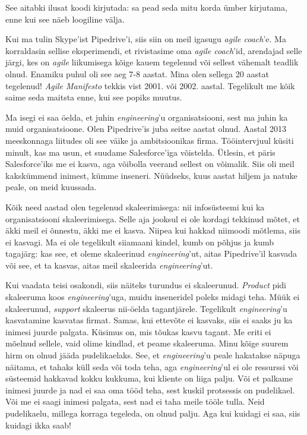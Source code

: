 See aitabki ilusat koodi kirjutada: sa 
pead seda mitu korda ümber kirjutama, enne kui see näeb loogiline välja.


Kui ma tulin Skype'ist Pipedrive'i, siis siin on meil 
igasugu \emph{agile coach}'e. Ma korraldasin sellise eksperimendi, et rivistasime oma 
\emph{agile coach}'id, arendajad selle järgi, kes on 
\emph{agile} liikumisega kõige kauem tegelenud või sellest vähemalt teadlik olnud. Enamiku puhul oli see aeg 7-8 aastat. Mina olen sellega 20 
aastat tegelenud! \emph{Agile Manifesto} tekkis vist 2001. või 
2002. aastal. Tegelikult me kõik saime seda maitsta enne, kui see popiks muutus.


Ma isegi ei saa öelda, et juhin \emph{engineering}'u 
organisatsiooni, sest ma juhin ka muid organisatsioone. Olen 
Pipedrive'is juba seitse aastat olnud. Aastal 
2013 meeskonnaga liitudes oli see väike ja ambitsioonikas firma. Tööintervjuul küsiti minult, kas ma usun, et suudame Salesforce'iga võistelda. Ütlesin, et päris 
Salesforce'iks me ei kasva, aga võibolla veerand sellest on võimalik. Siis 
oli meil kakskümmend inimest, kümme inseneri. Nüüdseks, kuus aastat hiljem ja natuke peale, on meid kuussada.

Kõik need aastad olen tegelenud skaleerimisega: nii infosüsteemi kui ka 
organisatsiooni skaleerimisega. Selle aja jooksul ei ole kordagi tekkinud mõtet, et 
äkki meil ei õnnestu, äkki me ei kasva. Niipea kui hakkad niimoodi mõtlema, siis 
ei kasvagi. Ma ei ole tegelikult siiamaani kindel, kumb on põhjus ja 
kumb tagajärg: kas see, et oleme skaleerinud \emph{engineering}'ut, 
aitas Pipedrive'il kasvada või see, et ta kasvas, aitas meil skaleerida 
\emph{engineering}'ut.

Kui vaadata teisi osakondi, siis näiteks turundus ei skaleerunud. 
\emph{Product} pidi skaleeruma koos \emph{engineering}'uga, muidu inseneridel 
poleks midagi teha. Müük ei skaleerunud, \emph{support} skaleerus 
nii-öelda tagantjärele. Tegelikult \emph{engineering}'u kasvatamine 
kasvatas firmat. Samas, kui ettevõte ei kasvaks, siis ei saaks ju ka 
inimesi juurde palgata. Küsimus on, 
mis tõukas kasvu tagant. Me eriti ei mõelnud sellele, vaid olime 
kindlad, et peame skaleeruma. Minu kõige suurem hirm on olnud jääda pudelikaelaks. See, et \emph{engineering}'u peale hakatakse 
näpuga näitama, et tahaks küll seda või toda teha, aga 
\emph{engineering}'ul ei ole ressurssi või süsteemid hakkavad 
kokku kukkuma, kui kliente on liiga palju. Või et palkame inimesi juurde ja 
nad ei saa oma tööd teha, sest kuskil protsessis on pudelikael. 
Või me ei saagi inimesi palgata, sest nad ei taha meile tööle tulla. Neid 
pudelikaelu, millega korraga tegeleda, on olnud palju. Aga kui kuidagi ei saa, siis kuidagi ikka saab!
